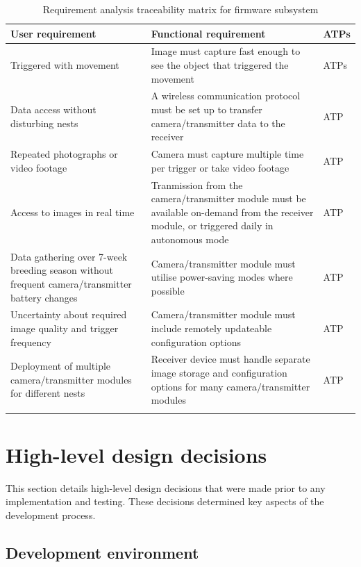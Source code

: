 \centering
\begin{longtable}{|p{}|p{}|p{}|}
    \hline
    \textbf{User requirement} & \textbf{Functional requirement} & \textbf{ATPs} \\ \hline
    Triggered with movement & Image must capture fast enough to see the object that triggered the movement & ATPs \\ \hline
    Data access without disturbing nests & A wireless communication protocol must be set up to transfer camera/transmitter data to the receiver & ATP \\ \hline
    Repeated photographs or video footage & Camera must capture multiple time per trigger or take video footage & ATP \\ \hline
    Access to images in real time & Tranmission from the camera/transmitter module must be available on-demand from the receiver module, or triggered daily in autonomous mode & ATP \\ \hline
    Data gathering over 7-week breeding season without frequent camera/transmitter battery changes & Camera/transmitter module must utilise power-saving modes where possible & ATP \\ \hline
    Uncertainty about required image quality and trigger frequency & Camera/transmitter module must include remotely updateable configuration options & ATP \\ \hline
    Deployment of multiple camera/transmitter modules for different nests & Receiver device must handle separate image storage and configuration options for many camera/transmitter modules & ATP \\ \hline
    \caption{Requirement analysis traceability matrix for firmware subsystem}
    \label{tab:firmware-requirements}
\end{longtable}
\raggedright


\section{High-level design decisions \label{s:firmware-design-decisions}}

This section details high-level design decisions that were made prior to any implementation and testing. These decisions determined key aspects of the development process.

\subsection{Development environment}


